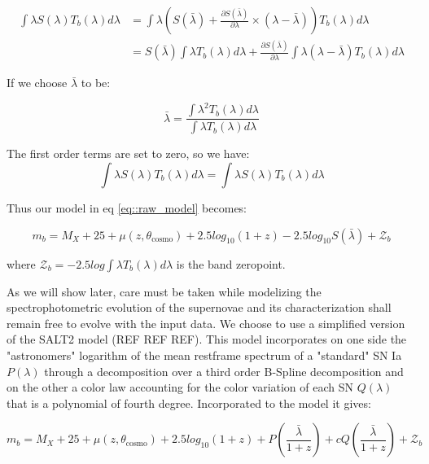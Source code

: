 \documentclass[\docopts]{\docclass}
\begin{document}
\begin{equation}
\begin{split}
\int \lambda S(\lambda) T_b(\lambda) d\lambda &= \int \lambda \left(S(\bar\lambda)+\frac{\partial S(\bar\lambda)}{\partial \lambda} \times ( \lambda - \bar\lambda ) \right) T_b(\lambda) d\lambda \\
&= S(\bar\lambda) \int \lambda T_b(\lambda) d\lambda + \frac{\partial S(\bar \lambda)}{\partial\lambda} \int \lambda (\lambda - \bar\lambda) T_b(\lambda) d\lambda
\end{split}
\end{equation}

If we choose $\bar \lambda$ to be:

\begin{equation}
  \bar \lambda = \frac{\int \lambda^2 T_b(\lambda) d\lambda}{\int \lambda T_b(\lambda) d\lambda}
\end{equation}

The first order terms are set to zero, so we have:
\begin{equation}
\int \lambda S(\lambda) T_b(\lambda) d\lambda = \int \lambda S(\lambda) T_b(\lambda) d\lambda
\end{equation}

Thus our model in eq \ref{eq::raw_model} becomes:
          
\begin{equation}
  m_b = M_X + 25 + \mu(z, \theta_\text{cosmo}) + 2.5log_{10}(1+z) - 2.5 log_{10} S(\bar \lambda) + \mathcal{Z}_b
\end{equation}

where $\mathcal{Z}_b = -2.5 log \int \lambda T_b(\lambda) d\lambda$ is the band zeropoint.

As we will show later, care must be taken while modelizing the spectrophotometric evolution of the supernovae and its characterization shall remain free to evolve with the input data.
We choose to use a simplified version of the SALT2 model (REF REF REF).
This model incorporates on one side the "astronomers" logarithm of the mean restframe spectrum of a "standard" SN Ia $P(\lambda)$ through a decomposition over a third order B-Spline decomposition and on the other a color law accounting for the color variation of each SN $Q(\lambda)$ that is a polynomial of fourth degree.
Incorporated to the model it gives:

\begin{equation}
m_b = M_X + 25 + \mu(z, \theta_\text{cosmo}) + 2.5log_{10}(1+z) + P(\frac{\bar \lambda}{1+z}) + cQ(\frac{\bar \lambda}{1+z})+ \mathcal{Z}_b
\end{equation}
\end{document}
